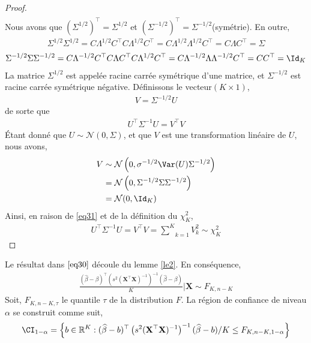 \begin{proof}
\begin{align*}
\end{align*}
Nous avons que $(\Sigma^{1/2})^\top = \Sigma^{1/2}$ et $(\Sigma^{-1/2})^\top = \Sigma^{-1/2}$(symétrie). En outre,
\begin{align*}
\Sigma^{1/2}\Sigma^{1/2} = C\Lambda^{1/2}C^\top C\Lambda^{1/2}C^\top = C\Lambda^{1/2}\Lambda^{1/2}C^\top = C\Lambda C^\top = \Sigma
\end{align*}
\begin{align*}
\Sigma^{-1/2}\Sigma\Sigma^{-1/2} = C\Lambda^{-1/2}C^\top C\Lambda C^\top C\Lambda^{1/2} C^\top= C\Lambda^{-1/2}\Lambda\Lambda^{-1/2}C^\top =  CC^\top = \Id_K
\end{align*}
La matrice $\Sigma^{1/2}$ est appelée racine carrée symétrique d'une matrice, et $\Sigma^{-1/2}$ est racine carrée symétrique négative. Définissons le vecteur$(K\times 1)$,
\begin{align*}
V = \Sigma^{-1/2}U
\end{align*}
de sorte que
\begin{align}
U^\top\Sigma^{-1}U = V^\top V
\label{eq31}
\end{align}
\'Etant donné que $U\sim \mathcal{N}(0, \Sigma)$, et que $V$ est une transformation linéaire de $U$, nous avons,
\begin{align*}
V &\sim\mathcal{N}\left(0, \sigma^{-1/2}\Var(U)\Sigma^{-1/2}\right)\\
&=\mathcal{N}\left(0, \Sigma^{-1/2}\Sigma\Sigma^{-1/2}\right)\\
&=\mathcal{N}(0, \Id_K)
\end{align*} 
Ainsi, en raison de \eqref{eq31} et de la définition du $\chi^2_K$,
\begin{align*}
U^\top\Sigma^{-1}U = V^\top V=\underset{k=1}{\overset{K}{\sum}}V_k^2 \sim\chi^2_K
\end{align*}
\end{proof}
Le résultat dans $\eqref{eq30}$ découle du lemme \ref{le2}. En conséquence,
\begin{align*}
\frac{
(\widehat{\beta}-\beta)^\top\left(s^2(\mathbf{X}^\top\mathbf{X})^{-1}\right)^{-1}(\widehat{\beta}-\beta)
}{K}|\mathbf{X}\sim F_{K, n-K}
\end{align*}
Soit, $ F_{K, n-K, \tau}$ le quantile $\tau$ de la distribution $F$. La région de confiance de niveau $\alpha$ se construit comme suit,
\begin{align*}
\CI_{1-\alpha} = \left\{b \in \mathbb{R}^K: (\widehat{\beta}-b)^\top\left(s^2(\mathbf{X}^\top\mathbf{X})^{-1}\right)^{-1}(\widehat{\beta}-b)/K \leq F_{K, n-K, 1-\alpha}\right\}
\end{align*}
